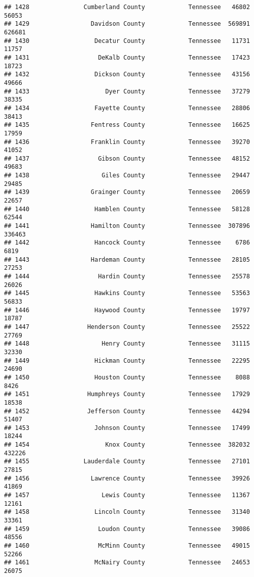 \documentclass[
]{article}
\begin{document}
\begin{verbatim}
## 1428               Cumberland County            Tennessee   46802   56053
## 1429                 Davidson County            Tennessee  569891  626681
## 1430                  Decatur County            Tennessee   11731   11757
## 1431                   DeKalb County            Tennessee   17423   18723
## 1432                  Dickson County            Tennessee   43156   49666
## 1433                     Dyer County            Tennessee   37279   38335
## 1434                  Fayette County            Tennessee   28806   38413
## 1435                 Fentress County            Tennessee   16625   17959
## 1436                 Franklin County            Tennessee   39270   41052
## 1437                   Gibson County            Tennessee   48152   49683
## 1438                    Giles County            Tennessee   29447   29485
## 1439                 Grainger County            Tennessee   20659   22657
## 1440                  Hamblen County            Tennessee   58128   62544
## 1441                 Hamilton County            Tennessee  307896  336463
## 1442                  Hancock County            Tennessee    6786    6819
## 1443                 Hardeman County            Tennessee   28105   27253
## 1444                   Hardin County            Tennessee   25578   26026
## 1445                  Hawkins County            Tennessee   53563   56833
## 1446                  Haywood County            Tennessee   19797   18787
## 1447                Henderson County            Tennessee   25522   27769
## 1448                    Henry County            Tennessee   31115   32330
## 1449                  Hickman County            Tennessee   22295   24690
## 1450                  Houston County            Tennessee    8088    8426
## 1451                Humphreys County            Tennessee   17929   18538
## 1452                Jefferson County            Tennessee   44294   51407
## 1453                  Johnson County            Tennessee   17499   18244
## 1454                     Knox County            Tennessee  382032  432226
## 1455               Lauderdale County            Tennessee   27101   27815
## 1456                 Lawrence County            Tennessee   39926   41869
## 1457                    Lewis County            Tennessee   11367   12161
## 1458                  Lincoln County            Tennessee   31340   33361
## 1459                   Loudon County            Tennessee   39086   48556
## 1460                   McMinn County            Tennessee   49015   52266
## 1461                  McNairy County            Tennessee   24653   26075

\end{verbatim}
\end{document}
